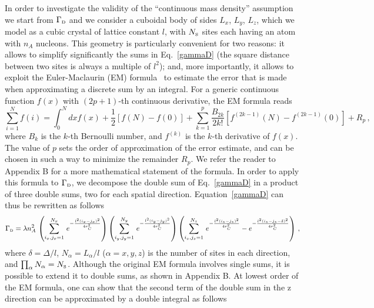 \documentclass[11pt,onecolumn,amssymb,nofootinbib]{revtex4}
\newcommand\beq{\begin{equation}}
\newcommand\eeq{\end{equation}}
\begin{document}
In order to investigate the validity of the ``continuous mass density'' assumption we start from $\Gamma_\text{\tiny{D}}$ and we consider a cuboidal body of sides $L_x$, $L_y$, $L_z$, which we model as a cubic crystal of lattice constant $l$, with $N_{\text{\tiny{S}}}$ sites each having an atom with $n_A$ nucleons. This geometry is particularly convenient for two reasons: it allows to simplify significantly the sums in Eq.~\eqref{gammaD} (the square distance between two sites is always a multiple of $l^2$); and, more importantly, it allows to exploit the Euler-Maclaurin (EM) formula~\cite{euler,maclaurin,AbrSte72,apostol} to estimate the error that is made when approximating a discrete sum by an integral. For a generic continuous function $f(x)$ with $(2p+1)$-th continuous derivative, the EM formula reads
\beq\label{EM}
\sum_{i=1}^Nf(i)=\int_0^Ndx f(x)+\frac{1}{2}\left[f(N)-f(0)\right]+\sum_{k=1}^{p}\frac{B_{2k}}{2k!}\left[f^{(2k-1)}(N)-f^{(2k-1)}(0)\right]+R_p\,,
\eeq
where %
$B_k$ is the $k$-th Bernoulli number, and $f^{(k)}$ is the $k$-th derivative of $f(x)$. The value of $p$ sets the order of approximation of the error estimate, and can be chosen in such a way to minimize the remainder $R_p$. 
We refer the reader to Appendix B for a more mathematical statement of the formula. In order to apply this formula to $\Gamma_\text{\tiny{D}}$, we decompose the double sum of Eq.~\eqref{gammaD} in a product of three double sums, two for each spatial direction. Equation~\eqref{gammaD} can thus be rewritten as follows
\beq\label{gammaDser}
\Gamma_\text{\tiny{D}}=\lambda n_A^2\, \left(\sum_{i_x,j_x=1}^{N_x}\,e^{-\frac{l^2(i_x-j_x)^2}{4r_C^2}}\right)\left(\sum_{i_y,j_y=1}^{N_y}\,e^{-\frac{l^2(i_y-j_y)^2}{4r_C^2}}\right)\left(\sum_{i_z,j_z=1}^{N_z}\,e^{-\frac{l^2(i_z-j_z)^2}{4r_C^2}}-e^{-\frac{l^2(i_z-j_z-\delta)^2}{4r_C^2}}\right)\,,
\eeq
where $\delta=\Delta/l$, $N_\alpha=L_\alpha/l$ ($\alpha=x,y,z$) is the number of sites in each direction, and $\prod_\alpha N_\alpha=N_{\text{\tiny{S}}}$. Although the original EM formula involves single sums, it is possible to extend it to double sums, as shown in Appendix B. At lowest order of the EM formula, one can show that the second term of the double sum in the z direction can be approximated by a double integral as follows
\end{document}
